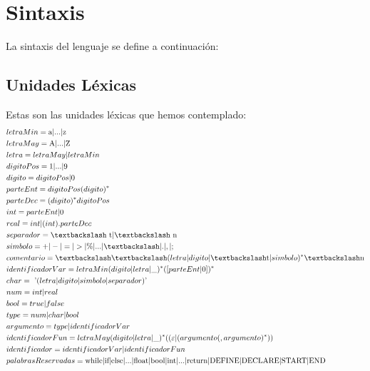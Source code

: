 \documentclass[a4paper, 12pt]{article}
\begin{document}
\section{Sintaxis}
La sintaxis del lenguaje se define a continuación:
\subsection{Unidades Léxicas}
Estas son las unidades léxicas que hemos contemplado:
\begin{align*}
&letraMin = \textrm{a|...|z}\\
&letraMay = \textrm{A|...|Z}\\
&letra =letraMay|letraMin\\
&digitoPos = \textrm{1|...|9}\\
&digito = digitoPos|\textrm{0}\\
&parteEnt = digitoPos(digito)^*\\
&parteDec = (digito)^*digitoPos\\
&int =parteEnt|\textrm{0}\\
&real =int|(int).parteDec\\
&separador=\textrm{\textbackslash t|\textbackslash  n}\\
&simbolo= +|-|=|>|\%|...|\textbackslash|.|,|;\\
&comentario=\textbackslash \textbackslash (letra|digito|\textbackslash \textrm{t}|simbolo)^* \textbackslash \textrm{n}\\
&identificadorVar =letraMin(digito|letra|\_)^*([parteEnt|\textrm{0}])^*\\
&char =\ \textrm{'}(letra|digito|simbolo|separador)\textrm{'}\\
&num =int|real\\
&bool =true|false\\
&type =num|char|bool\\
&argumento =type|identificadorVar\\
&identificadorFun =letraMay(digito|letra|\_)^*((\varepsilon|(argumento(,argumento)^*))\\
&identificador =identificadorVar|identificadorFun\\
&palabrasReservadas= \textrm{while|if|else|...|float|bool|int|...|return|DEFINE|DECLARE|START|END}\\
\end{align*}
\end{document}
